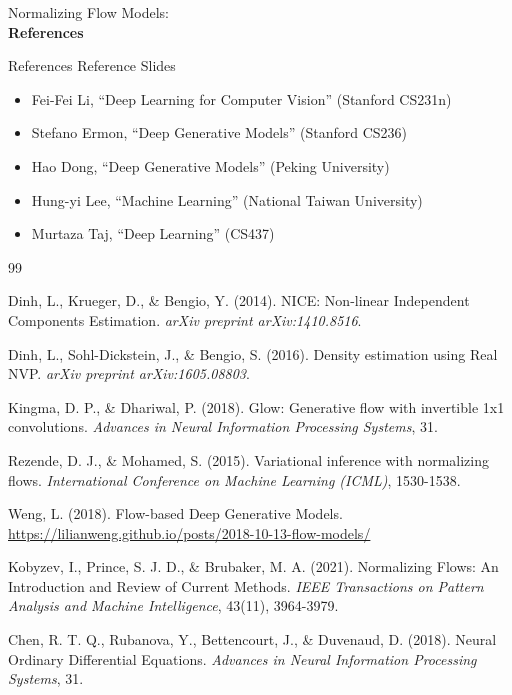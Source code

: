 \begin{frame}[allowframebreaks]{}
    \LARGE Normalizing Flow Models: \\[1.5ex] \textbf{References}
\end{frame}

\begin{frame}[allowframebreaks]{References}
    Reference Slides
\begin{itemize}
    \item Fei-Fei Li, ``Deep Learning for Computer Vision'' (Stanford CS231n)
    \item Stefano Ermon, ``Deep Generative Models'' (Stanford CS236)
    \item Hao Dong, ``Deep Generative Models'' (Peking University)
    \item Hung-yi Lee, ``Machine Learning'' (National Taiwan University)
    \item Murtaza Taj, ``Deep Learning'' (CS437)
\end{itemize}
\framebreak
    \begin{thebibliography}{99}

    Dinh, L., Krueger, D., \& Bengio, Y. (2014).
    NICE: Non-linear Independent Components Estimation.
    \textit{arXiv preprint arXiv:1410.8516}.

    Dinh, L., Sohl-Dickstein, J., \& Bengio, S. (2016).
    Density estimation using Real NVP.
    \textit{arXiv preprint arXiv:1605.08803}.

    Kingma, D. P., \& Dhariwal, P. (2018).
    Glow: Generative flow with invertible 1x1 convolutions.
    \textit{Advances in Neural Information Processing Systems}, 31.

    Rezende, D. J., \& Mohamed, S. (2015).
    Variational inference with normalizing flows.
    \textit{International Conference on Machine Learning (ICML)}, 1530-1538.

    Weng, L. (2018).
    Flow-based Deep Generative Models.
    \url{https://lilianweng.github.io/posts/2018-10-13-flow-models/}

    Kobyzev, I., Prince, S. J. D., \& Brubaker, M. A. (2021).
    Normalizing Flows: An Introduction and Review of Current Methods.
    \textit{IEEE Transactions on Pattern Analysis and Machine Intelligence}, 43(11), 3964-3979.

    Chen, R. T. Q., Rubanova, Y., Bettencourt, J., \& Duvenaud, D. (2018).
    Neural Ordinary Differential Equations.
    \textit{Advances in Neural Information Processing Systems}, 31.


\end{thebibliography}
\end{frame}

